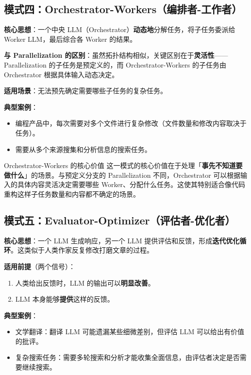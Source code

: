 \subsection{模式四：Orchestrator-Workers（编排者-工作者）}

\textbf{核心思想}：一个中央 LLM（Orchestrator）\textbf{动态地}分解任务，将子任务委派给 Worker LLM，最后综合各 Worker 的结果。

\textbf{与 Parallelization 的区别}：虽然拓扑结构相似，关键区别在于\textbf{灵活性}——Parallelization 的子任务是预定义的，而 Orchestrator-Workers 的子任务由 Orchestrator 根据具体输入动态决定。

\textbf{适用场景}：无法预先确定需要哪些子任务的复杂任务。

\textbf{典型案例}：
\begin{itemize}
    \item 编程产品中，每次需要对多个文件进行复杂修改（文件数量和修改内容取决于任务）。
    \item 需要从多个来源搜集和分析信息的搜索任务。
\end{itemize}

\begin{importantbox}{Orchestrator-Workers 的核心价值}
这一模式的核心价值在于处理「\textbf{事先不知道要做什么}」的场景。与预定义分支的 Parallelization 不同，Orchestrator 可以根据输入的具体内容灵活决定需要哪些 Worker、分配什么任务。这使其特别适合像代码重构这样子任务数量和内容都不确定的场景。
\end{importantbox}

\subsection{模式五：Evaluator-Optimizer（评估者-优化者）}

\textbf{核心思想}：一个 LLM 生成响应，另一个 LLM 提供评估和反馈，形成\textbf{迭代优化循环}。这类似于人类作家反复修改打磨文章的过程。

\textbf{适用前提}（两个信号）：
\begin{enumerate}
    \item 人类给出反馈时，LLM 的输出可以\textbf{明显改善}。
    \item LLM 本身能够\textbf{提供}这样的反馈。
\end{enumerate}

\textbf{典型案例}：
\begin{itemize}
    \item 文学翻译：翻译 LLM 可能遗漏某些细微差别，但评估 LLM 可以给出有价值的批评。
    \item 复杂搜索任务：需要多轮搜索和分析才能收集全面信息，由评估者决定是否需要继续搜索。
\end{itemize}

